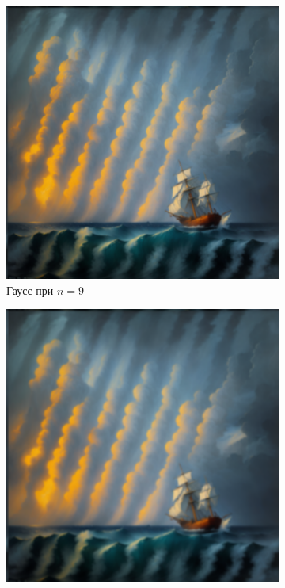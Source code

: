 \documentclass[a4paper, 12pt]{article}
\begin{document}
    \begin{figure}[H]
        \centering
        \begin{subfigure}{0.30\textwidth}
            \centering
            \includegraphics[width=\linewidth]{g_fft2_n=9.png}
            \caption{Гаусс при $n=9$}
            \label{fig:g_fft2_n=9}
        \end{subfigure}
        \begin{subfigure}{0.30\textwidth}
            \centering
            \includegraphics[width=\linewidth]{g_fft2_n=13.png}

\end{subfigure}
\end{figure}
\end{document}
